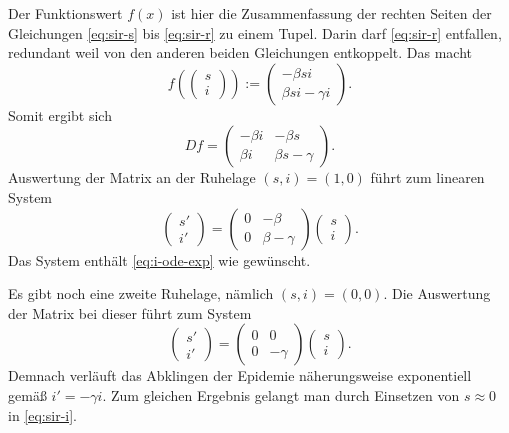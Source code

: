 \documentclass[a4paper,10pt,fleqn,twocolumn,dvipdfmx]{scrartcl}
\numberwithin{equation}{section}
\begin{document}
Der Funktionswert $f(x)$ ist hier die Zusammenfassung der rechten
Seiten der Gleichungen \eqref{eq:sir-s} bis \eqref{eq:sir-r} zu einem
Tupel. Darin darf \eqref{eq:sir-r} entfallen, redundant weil von
den anderen beiden Gleichungen entkoppelt. Das macht%
\begin{equation}
f(\begin{pmatrix}s\\ i\end{pmatrix})
:= \begin{pmatrix}-\beta s i\\ \beta si - \gamma i\end{pmatrix}.
\end{equation}
Somit ergibt sich
\begin{equation}
Df = \begin{pmatrix}
-\beta i & -\beta s\\
\beta i & \beta s - \gamma
\end{pmatrix}.
\end{equation}
Auswertung der Matrix an der Ruhelage $(s,i)=(1,0)$ führt zum linearen
System%
\begin{equation}
\begin{pmatrix}
s'\\ i'
\end{pmatrix}
= \begin{pmatrix}
0 & -\beta\\
0 & \beta-\gamma
\end{pmatrix}
\begin{pmatrix}
s\\ i
\end{pmatrix}.
\end{equation}
Das System enthält \eqref{eq:i-ode-exp} wie gewünscht.

Es gibt noch eine zweite Ruhelage, nämlich $(s,i)=(0,0)$. Die
Auswertung der Matrix bei dieser führt zum System
\begin{equation}
\begin{pmatrix}
s'\\ i'
\end{pmatrix}
= \begin{pmatrix}
0 & 0\\
0 & -\gamma
\end{pmatrix}
\begin{pmatrix}
s\\ i
\end{pmatrix}.
\end{equation}
Demnach verläuft das Abklingen der Epidemie näherungsweise exponentiell
gemäß $i' = -\gamma i$. Zum gleichen Ergebnis gelangt man durch
Einsetzen von $s\approx 0$ in \eqref{eq:sir-i}.
\end{document}
